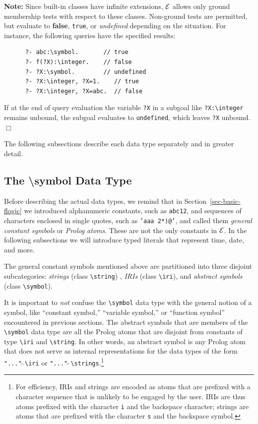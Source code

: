 \documentclass[11pt]{article}
\newcommand{\ERGO}{\mbox{\ensuremath{\cal{E}}\smaller{{\sc{RGO}}}}\xspace}
\newcommand{\FLSYSTEM}{\ERGO}
\newcommand{\bs}{\textbackslash}
\begin{document}
\noindent
{\bf Note:} Since built-in classes have infinite extensions, \FLSYSTEM
allows only
ground membership tests with respect to these classes. Non-ground tests are
permitted, but evaluate to {\bf false}, \texttt{true}, or \emph{undefined} 
depending on the
situation. For instance, the following
queries have the specified results:
\begin{verbatim}
      ?- abc:\symbol.       // true
      ?- f(?X):\integer.    // false
      ?- ?X:\symbol.        // undefined
      ?- ?X:\integer, ?X=1.    // true
      ?- ?X:\integer, ?X=abc.  // false
\end{verbatim}
If at the end of query evaluation the variable \texttt{?X} in a subgoal like
\texttt{?X:\bs{}integer} remains
unbound, the subgoal evaluates to \texttt{undefined}, which
leaves \texttt{?X} unbound.
\hfill$\Box$

The following subsections
describe each data type separately and in greater detail.

\subsection{The \bs{}symbol Data Type}

\index{datatype!\bs{}symbol}
Before describing the actual data types, we remind that
in Section~\ref{sec-basic-flogic} we introduced
alphanumeric constants, such as {\tt abc12}, and sequences of characters
enclosed in single quotes, such as {\tt 'aaa 2*)@'},  and called them
\emph{general constant symbols} or \emph{Prolog atoms}. These are not the
only constants in \FLSYSTEM.
In the following subsections we will introduce typed literals that
represent time, date, and more.

\index{class!\bs{}symbol}
The general constant symbols mentioned above are partitioned into three
disjoint subcategories:
\emph{strings} (class \texttt{\bs{}string}) , \emph{IRIs} (class
\texttt{\bs{}iri}), and \emph{abstract symbols} (class \texttt{\bs{}symbol}). 

It is important to
\emph{not} confuse the \texttt{\bs{}symbol} data type with the general
notion of a symbol, like ``constant symbol,''  ``variable symbol,'' or
``function symbol'' encountered in previous sections.
The abstract symbols that are members of the \texttt{\bs{}symbol} data type
are all the Prolog atoms that
are disjoint from constants of type \texttt{\bs{}iri} and
\texttt{\bs{}string}. In other words, an abstract symbol is any Prolog atom
that does not   
serve as internal representations for the data types
of the form \texttt{"..."$\hat{~}\hat{~}$\bs{}iri} or
\texttt{"..."$\hat{~}\hat{~}$\bs{}strings}.\footnote{
  For efficiency, IRIs and strings are encoded as atoms that are prefixed
  with a character sequence that is unlikely to be engaged by the user.
  IRIs are thus atoms prefixed
  with the character \texttt{i} and the backspace character; strings are atoms
  that are prefixed with the character
  \texttt{s} and the backspace symbol.
  }
\end{document}
